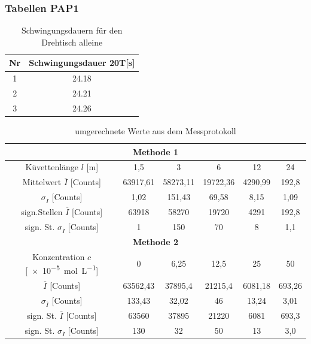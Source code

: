 \subsubsection{Tabellen PAP1}
\begin{table}[h]
    \centering
    \caption{Schwingungsdauern für den Drehtisch alleine}
\begin{tabular}{|c|c|}\hline
\rule{0pt}{2ex} Nr & Schwingungsdauer 20T{[s]} \\\hline
1  & 24.18                       \\
2  & 24.21                       \\
3  & 24.26                 \\ \hline    
\end{tabular}
\label{table:extraWerte}
\end{table}
\newpage
\renewcommand{\arraystretch}{1.3}  
\begin{table}[!h]
    \centering
\begin{tabular}{|c|ccccc|}
\hline
                                          \multicolumn{6}{|c|}{\textbf{Methode 1}}                    \\ \hline
Küvettenlänge $l$ [\si{\meter}]                                        & 1,5    & 3        & 6        & 12      & 24     \\ \hline
Mittelwert $\overline{I}$ [Counts] & 63917,61 & 58273,11 & 19722,36 & 4290,99 & 192,8  \\
$\sigma_{\overline{I}}$ [Counts]     & 1,02     & 151,43   & 69,58    & 8,15    & 1,09   \\ \hline
sign.Stellen $\overline{I}$ [Counts] & 63918 & 58270 & 19720 & 4291 & 192,8  \\
sign. St. $\sigma_{\overline{I}}$ [Counts]     & 1     & 150   & 70    & 8    & 1,1   \\ 
\hline\hline
                                          \multicolumn{6}{|c|}{\textbf{Methode 2}}                    \\ \hline
Konzentration $c$ [\SI{e-5}{\mole\per\liter}] & 0     & 6,25    & 12,5    & 25    & 50  \\ \hline
$\overline{I}$ [Counts]             & 63562,43 & 37895,4  & 21215,4  & 6081,18 & 693,26 \\
$\sigma_{\overline{I}}$ [Counts]    & 133,43   & 32,02    & 46       & 13,24   & 3,01   \\ \hline
sign. St. $\overline{I}$ [Counts]             & 63560 & 37895  & 21220  & 6081 & 693,3 \\
sign. St. $\sigma_{\overline{I}}$ [Counts]    & 130   & 32    & 50       & 13   & 3,0   \\ \hline
\end{tabular}
\caption{umgerechnete Werte aus dem Messprotokoll}
\label{table:Werte}
\end{table}


